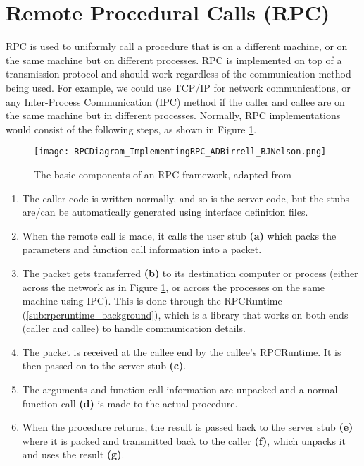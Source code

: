 \section{Remote Procedural Calls (RPC)} %
\label{sec:rpc_background}

RPC is used to uniformly call a procedure that is on a different machine, or on the same machine but on different processes. RPC is implemented on top of a transmission protocol and should work regardless of the communication method being used. For example, we could use TCP/IP for network communications, or any Inter-Process Communication (IPC) method if the caller and callee are on the same machine but in different processes. Normally, RPC implementations would consist of the following steps, as shown in Figure \ref{fig:rpc-components}.

\begin{figure}
    \centering
    \texttt{[image: RPCDiagram\_ImplementingRPC\_ADBirrell\_BJNelson.png]} 
    \caption{The basic components of an RPC framework, adapted from \cite{birrell1984implementing}}
    \label{fig:rpc-components}
\end{figure}

\begin{enumerate}
  \item The caller code is written normally, and so is the server code, but the stubs are/can be automatically generated using interface definition files.
  \item When the remote call is made, it calls the user stub \textbf{(a)} which packs the parameters and function call information into a packet.
  \item The packet gets transferred \textbf{(b)} to its destination computer or process (either across the network as in Figure \ref{fig:rpc-components}, or across the processes on the same machine using IPC). This is done through the RPCRuntime (\ref{sub:rpcruntime_background}), which is a library that works on both ends (caller and callee) to handle communication details.
  \item The packet is received at the callee end by the callee's RPCRuntime. It is then passed on to the server stub \textbf{(c)}.
  \item The arguments and function call information are unpacked and a normal function call \textbf{(d)} is made to the actual procedure.
  \item When the procedure returns, the result is passed back to the server stub \textbf{(e)} where it is packed and transmitted back to the caller \textbf{(f)}, which unpacks it and uses the result \textbf{(g)}.
\end{enumerate}


